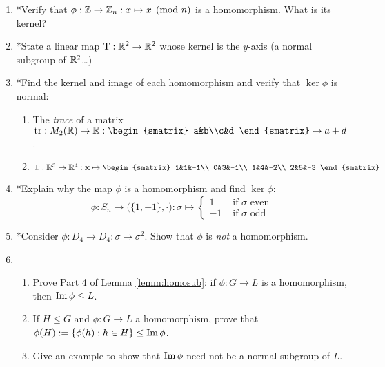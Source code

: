 \begin{exercises}
\begin{enumerate}
		
		
		\item *Verify that $\phi:\mathbb{Z}\to\mathbb{Z}_n:x\mapsto x\pmod n$ is a homomorphism. What is its kernel? 
			
		\item *State a linear map $\mathrm{T}:\mathbb{R}^2\to\mathbb{R}^2$ whose kernel is the $y$-axis (a normal subgroup of $\mathbb{R}^2$\ldots)
		
		
		\item *Find the kernel and image of each homomorphism and verify that $\ker\phi$ is normal:
		\begin{enumerate}
		  \item The \emph{trace} of a matrix $\tr:M_2(\R)\to\R:
		  \smash{
			  \begin{smatrix}
					a&b\\c&d
			  \end{smatrix}
		  }
		  \mapsto a+d$.
			
			\item $\rT:\R^3\to\R^4:\vx\mapsto 
			\begin{smatrix}
				1&1&-1\\
				0&3&-1\\
				1&4&-2\\
				2&5&-3
			\end{smatrix}$
		\end{enumerate}
		
		
		\item *Explain why the map $\phi$ is a homomorphism and find $\ker\phi$:
		\[
			\phi:S_n\to \bigl(\{1,-1\},\cdot\bigr):\sigma \mapsto 
			\begin{cases}
	  		1&\text{ if $\sigma$ even}\\
	  		-1&\text{ if $\sigma$ odd}
			\end{cases}
		\]
		
		
	  \item *Consider $\phi:D_4\to D_4:\sigma\mapsto \sigma^2$. Show that $\phi$ is \emph{not} a homomorphism.
	
	
		\item\begin{enumerate}
		  \item Prove Part 4 of Lemma \ref{lemm:homosub}: if $\phi:G\to L$ is a homomorphism, then $\operatorname{Im}\phi\le L$.
		 	\item If $H\le G$ and $\phi:G\to L$ a homomorphism, prove that $\phi(H):=\{\phi(h):h\in H\}\le\operatorname{Im}\phi$.
		  \item Give an example to show that $\operatorname{Im}\phi$ need not be a normal subgroup of $L$.
		\end{enumerate}
	

\end{enumerate}
\end{exercises}
